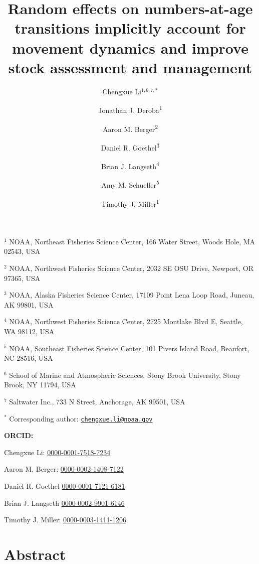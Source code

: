 \documentclass[
  12pt,
]{article}
\title{Random effects on numbers-at-age transitions implicitly account
for movement dynamics and improve stock assessment and management}
\author{Chengxue Li\(^{1,6,7,*}\) \and Jonathan J.
Deroba\textsuperscript{1} \and Aaron M.
Berger\textsuperscript{2} \and Daniel R.
Goethel\textsuperscript{3} \and Brian J.
Langseth\textsuperscript{4} \and Amy M.
Schueller\textsuperscript{5} \and Timothy J. Miller\textsuperscript{1}}
\date{}
\begin{document}
\maketitle

\(^{1}\) NOAA, Northeast Fisheries Science Center, 166 Water Street,
Woods Hole, MA 02543, USA

\(^{2}\) NOAA, Northwest Fisheries Science Center, 2032 SE OSU Drive,
Newport, OR 97365, USA

\(^{3}\) NOAA, Alaska Fisheries Science Center, 17109 Point Lena Loop
Road, Juneau, AK 99801, USA

\(^{4}\) NOAA, Northwest Fisheries Science Center, 2725 Montlake Blvd E,
Seattle, WA 98112, USA

\(^{5}\) NOAA, Southeast Fisheries Science Center, 101 Pivers Island
Road, Beaufort, NC 28516, USA

\(^{6}\) School of Marine and Atmospheric Sciences, Stony Brook
University, Stony Brook, NY 11794, USA

\(^{7}\) Saltwater Inc., 733 N Street, Anchorage, AK 99501, USA

\(^{*}\) Corresponding author:
\href{mailto:chengxue.li@noaa.gov}{\nolinkurl{chengxue.li@noaa.gov}}

\vspace{0.5cm}

\textbf{ORCID:}

Chengxue Li:
\href{https://orcid.org/0000-0001-7518-7234}{0000-0001-7518-7234}

Aaron M. Berger:
\href{https://orcid.org/0000-0002-1408-7122}{0000-0002-1408-7122}

Daniel R. Goethel
\href{https://orcid.org/0000-0001-7121-6181}{0000-0001-7121-6181}

Brian J. Langseth
\href{https://orcid.org/0000-0002-9901-6146}{0000-0002-9901-6146}

Timothy J. Miller:
\href{https://orcid.org/0000-0003-1411-1206}{0000-0003-1411-1206}

\pagebreak

\hypertarget{abstract}{%
\section*{Abstract}\label{abstract}}
\end{document}
